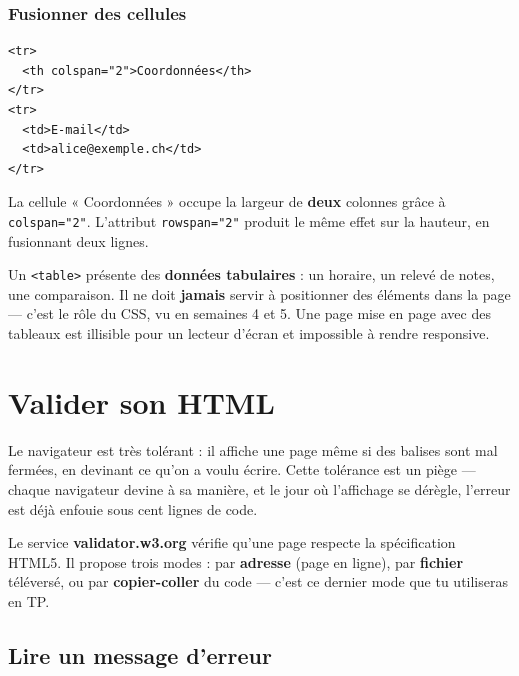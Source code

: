 \documentclass[a4paper,11pt]{article}
\begin{document}
\subsubsection*{Fusionner des cellules}

\begin{lstlisting}[language=HTML5, caption={Fusion horizontale avec colspan}]
<tr>
  <th colspan="2">Coordonnées</th>
</tr>
<tr>
  <td>E-mail</td>
  <td>alice@exemple.ch</td>
</tr>
\end{lstlisting}

La cellule « Coordonnées » occupe la largeur de \textbf{deux} colonnes grâce à \texttt{colspan="2"}. L'attribut \texttt{rowspan="2"} produit le même effet sur la hauteur, en fusionnant deux lignes.

\begin{tcolorbox}[interdit, title={Un tableau sert à présenter des données, jamais à mettre en page}]
Un \texttt{<table>} présente des \textbf{données tabulaires} : un horaire, un relevé de notes, une comparaison. Il ne doit \textbf{jamais} servir à positionner des éléments dans la page --- c'est le rôle du CSS, vu en semaines 4 et 5. Une page mise en page avec des tableaux est illisible pour un lecteur d'écran et impossible à rendre responsive.
\end{tcolorbox}

\section{Valider son HTML}

Le navigateur est très tolérant : il affiche une page même si des balises sont mal fermées, en devinant ce qu'on a voulu écrire. Cette tolérance est un piège --- chaque navigateur devine à sa manière, et le jour où l'affichage se dérègle, l'erreur est déjà enfouie sous cent lignes de code.

\begin{tcolorbox}[definition, title={Le validateur du W3C}]
Le service \textbf{validator.w3.org} vérifie qu'une page respecte la spécification HTML5. Il propose trois modes : par \textbf{adresse} (page en ligne), par \textbf{fichier} téléversé, ou par \textbf{copier-coller} du code --- c'est ce dernier mode que tu utiliseras en TP.
\end{tcolorbox}

\subsection{Lire un message d'erreur}
\end{document}
